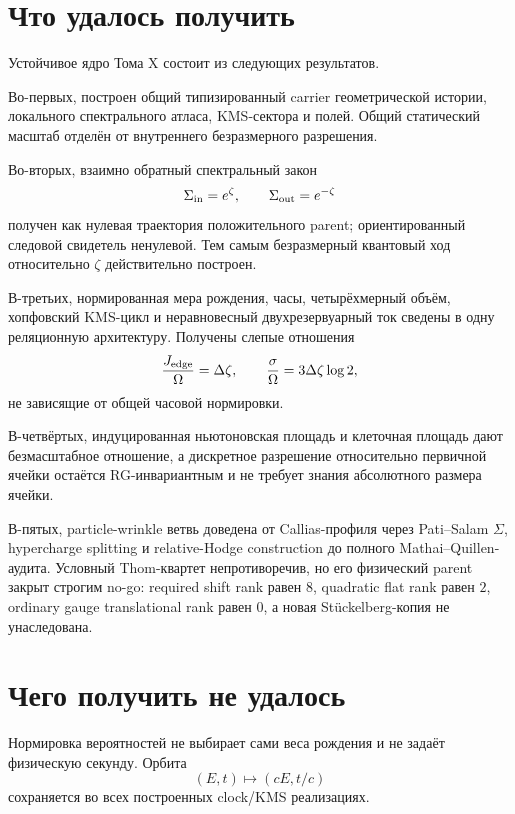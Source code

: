 \section{Что удалось получить}

Устойчивое ядро Тома X состоит из следующих результатов.

Во-первых, построен общий типизированный carrier геометрической истории,
локального спектрального атласа, KMS-сектора и полей. Общий статический
масштаб отделён от внутреннего безразмерного разрешения.

Во-вторых, взаимно обратный спектральный закон
\begin{equation}
 \Sigma_{\rm in}=e^\zeta,
 \qquad
 \Sigma_{\rm out}=e^{-\zeta}
\end{equation}
получен как нулевая траектория положительного parent; ориентированный
следовой свидетель ненулевой. Тем самым безразмерный квантовый ход
относительно $\zeta$ действительно построен.

В-третьих, нормированная мера рождения, часы, четырёхмерный объём,
хопфовский KMS-цикл и неравновесный двухрезервуарный ток сведены в одну
реляционную архитектуру. Получены слепые отношения
\begin{equation}
 \frac{J_{\rm edge}}{\Omega}=\Delta\zeta,
 \qquad
 \frac{\sigma}{\Omega}=3\Delta\zeta\log2,
\end{equation}
не зависящие от общей часовой нормировки.

В-четвёртых, индуцированная ньютоновская площадь и клеточная площадь дают
безмасштабное отношение, а дискретное разрешение относительно первичной
ячейки остаётся RG-инвариантным и не требует знания абсолютного размера
ячейки.

В-пятых, particle-wrinkle ветвь доведена от Callias-профиля через
Pati--Salam $\Sigma$, hypercharge splitting и relative-Hodge construction
до полного Mathai--Quillen-аудита. Условный Thom-квартет непротиворечив,
но его физический parent закрыт строгим no-go: required shift rank равен
$8$, quadratic flat rank равен $2$, ordinary gauge translational rank
равен $0$, а новая Stückelberg-копия не унаследована.

\section{Чего получить не удалось}

Нормировка вероятностей не выбирает сами веса рождения и не задаёт
физическую секунду. Орбита
\begin{equation}
 (E,t)\longmapsto(cE,t/c)
\end{equation}
сохраняется во всех построенных clock/KMS реализациях.

